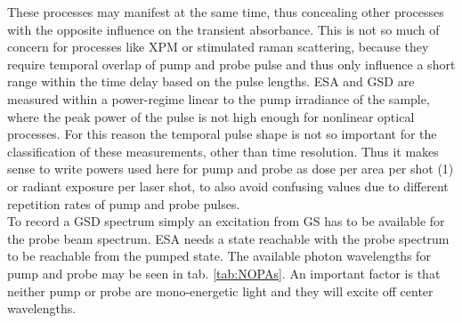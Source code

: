 \documentclass[twoside,openright]{scrreprt}
\begin{document}
These processes may manifest at the same time, thus concealing other processes with the opposite influence on the transient absorbance. This is not so much of concern for processes like XPM or stimulated raman scattering, because they require temporal overlap of pump and probe pulse and thus only influence a short range within the time delay based on the pulse lengths. ESA and GSD are measured within a power-regime linear to the pump irradiance of the sample, where the peak power of the pulse is not high enough for nonlinear optical processes. For this reason the temporal pulse shape is not so important for the classification of these measurements, other than time resolution. Thus it makes sense to write powers used here for pump and probe as dose per area per shot (\SI{1}{\radExp}) or radiant exposure per laser shot, to also avoid confusing values due to different repetition rates of pump and probe pulses.\\

To record a GSD spectrum simply an excitation from GS has to be available for the probe beam spectrum. ESA needs a state reachable with the probe spectrum to be reachable from the pumped state. The available photon wavelengths for pump and probe may be seen in tab. \ref{tab:NOPAs}. An important factor is that neither pump or probe are mono-energetic light and they will excite off center wavelengths.
\end{document}
